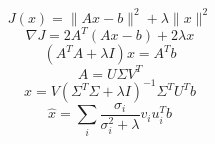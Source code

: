 \documentclass{article}
\begin{document}
\[
J(x)=\|Ax-b\|^2+\lambda\|x\|^2
\]
\[
\nabla J=2A^T(Ax-b)+2\lambda x
\]
\[
(A^TA+\lambda I)x=A^Tb
\]
\[
A=U\Sigma V^T
\]
\[
\hat{x}=V(\Sigma^T\Sigma+\lambda I)^{-1}\Sigma^TU^Tb
\]
\[
\hat{x}=\sum_i\frac{\sigma_i}{\sigma_i^2+\lambda}v_i u_i^Tb
\]
\end{document}
